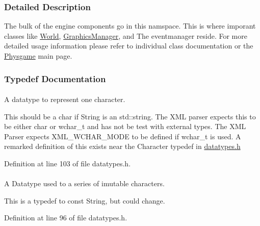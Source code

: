 \subsubsection{Detailed Description}
The bulk of the engine components go in this namspace. This is where imporant classes like \hyperlink{classphys_1_1World}{World}, \hyperlink{classphys_1_1GraphicsManager}{GraphicsManager}, and The eventmanager reside. For more detailed usage information please refer to individual class documentation or the \hyperlink{index}{Physgame} main page. 

\subsubsection{Typedef Documentation}
\hypertarget{namespacephys_a3098bae5b0a3cd16eec331f766cc562b}{
\paragraph[{Character}]{}\hfill}
\label{df/dec/namespacephys_a3098bae5b0a3cd16eec331f766cc562b}


A datatype to represent one character. 

This should be a char if String is an std::string. The XML parser expects this to be either char or wchar\_\-t and has not be test with external types. The XML Parser expects XML\_\-WCHAR\_\-MODE to be defined if wchar\_\-t is used. A remarked definition of this exists near the Character typedef in \hyperlink{datatypes_8h_source}{datatypes.h} 

Definition at line 103 of file datatypes.h.

\hypertarget{namespacephys_a5ce5049f8b4bf88d6413c47b504ebb31}{
\paragraph[{ConstString}]{}\hfill}
\label{df/dec/namespacephys_a5ce5049f8b4bf88d6413c47b504ebb31}


A Datatype used to a series of imutable characters. 

This is a typedef to const String, but could change. 

Definition at line 96 of file datatypes.h.

